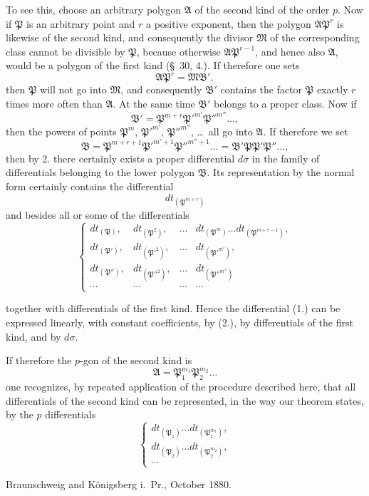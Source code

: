 \documentclass{article}
\begin{document}
To see this, choose an arbitrary polygon $\mathfrak{A}$ of the second kind of the order $p$. Now if $\mathfrak{P}$ is an arbitrary point and $r$ a positive exponent, then the polygon $\mathfrak{A}\mathfrak{P}^{r}$ is likewise of the second kind, and consequently the divisor $\mathfrak{M}$ of the corresponding class cannot be divisible by $\mathfrak{P}$, because otherwise $\mathfrak{A}\mathfrak{P}^{r-1}$, and hence also $\mathfrak{A}$, would be a polygon of the first kind (§~30, 4.). If therefore one sets
\[ \mathfrak{A}\mathfrak{P}^{r} = \mathfrak{M}\mathfrak{B}', \]
then $\mathfrak{P}$ will not go into $\mathfrak{M}$, and consequently $\mathfrak{B}'$ contains the factor $\mathfrak{P}$ exactly $r$ times more often than $\mathfrak{A}$. At the same time $\mathfrak{B}'$ belongs to a proper class. Now if
\[ \mathfrak{B}' = \mathfrak{P}^{m+r}\mathfrak{P}'^{m'}\mathfrak{P}''^{m''}\ldots, \]
then the powers of points $\mathfrak{P}^{m}$, $\mathfrak{P}'^{m'}$, $\mathfrak{P}''^{m''}$, \ldots\ all go into $\mathfrak{A}$. If therefore we set
\[ \mathfrak{B} = \mathfrak{P}^{m+r+1}\mathfrak{P}'^{m'+1}\mathfrak{P}''^{m''+1}\ldots = \mathfrak{B}'\mathfrak{P}\mathfrak{P}'\mathfrak{P}''\ldots, \]
then by 2. there certainly exists a proper differential $d\sigma$ in the family of differentials belonging to the lower polygon $\mathfrak{B}$. Its representation by the normal form certainly contains the differential
\[ dt_{(\mathfrak{P}^{m+r})} \tag{1.} \]
and besides all or some of the differentials
\[ \left\{ \begin{matrix}
dt_{(\mathfrak{P})}, & dt_{(\mathfrak{P}^{2})}, & \ldots & dt_{(\mathfrak{P}^{m})}\ldots dt_{(\mathfrak{P}^{m+r-1})}, \\
dt_{(\mathfrak{P}')}, & dt_{(\mathfrak{P}'^{2})}, & \ldots & dt_{(\mathfrak{P}'^{m'})}, \\
dt_{(\mathfrak{P}'')}, & dt_{(\mathfrak{P}''^{2})}, & \ldots & dt_{(\mathfrak{P}''^{m''})} \\
\cdots & \cdots & \cdots & \cdots
\end{matrix} \right. \tag{2.} \]

together with differentials of the first kind. Hence the differential (1.) can be expressed linearly, with constant coefficients, by (2.), by differentials of the first kind, and by $d\sigma$.

If therefore the $p$-gon of the second kind is
\[ \mathfrak{A} = \mathfrak{P}_{1}^{m_{1}}\mathfrak{P}_{2}^{m_{2}}\ldots \]
one recognizes, by repeated application of the procedure described here, that all differentials of the second kind can be represented, in the way our theorem states, by the $p$ differentials
\[ \left\{ \begin{matrix}
dt_{(\mathfrak{P}_{1})}\ldots dt_{(\mathfrak{P}_{1}^{m_{1}})}, \\
dt_{(\mathfrak{P}_{2})}\ldots dt_{(\mathfrak{P}_{2}^{m_{2}})}, \\
\cdots
\end{matrix} \right. \tag{3.} \]

Braunschweig and Königsberg i.\ Pr., October 1880.
\end{document}
